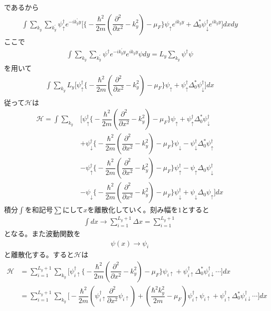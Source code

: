 \documentclass{jarticle}
\begin{document}
	であるから
	\begin{align}
	\int\displaystyle\sum_{k_y}\sum_{k_y^{'}}\psi_{\uparrow}^{\dagger}e^{-ik_y^{'}y}\Big[\big\{-\dfrac{\hbar^2}{2m}(\dfrac{\partial^{2}}{\partial x^2}-k^{2}_y)-\mu_F\big\}\psi_{\uparrow}e^{ik_yy}+\Delta^{*}_0\psi_{\downarrow}^{\dagger}e^{ik_yy}\Big]dxdy
	\end{align}
	ここで
	\begin{align}
	\int\displaystyle\sum_{k_y}\sum_{k_y^{'}}\psi^{\dagger}e^{-ik_y^{'}y}e^{ik_yy}{\psi}dy=L_y\sum_{k_y}\psi^{\dagger}\psi
	\end{align}
	を用いて
	\begin{align}
	\int\displaystyle\sum_{k_y}L_y\Big[\psi_{\uparrow}^{\dagger}\big\{-\dfrac{\hbar^2}{2m}(\dfrac{\partial^{2}}{\partial x^2}-k^{2}_y)-\mu_F\big\}\psi_{\uparrow}+\psi_{\uparrow}^{\dagger}\Delta^{*}_0\psi_{\downarrow}^{\dagger}\Big]dx
	\end{align}
	従って$\mathcal{H}$は
	\begin{align}
	\mathcal{H}=\int\displaystyle\sum_{k_y}&\Big[\psi_{\uparrow}^{\dagger}\big\{-\dfrac{\hbar^2}{2m}(\dfrac{\partial^{2}}{\partial x^2}-k^{2}_y)-\mu_F\big\}\psi_{\uparrow}+\psi_{\uparrow}^{\dagger}\Delta^{*}_0\psi_{\downarrow}^{\dagger}\\
	&+\psi_{\downarrow}^{\dagger}\big\{-\dfrac{\hbar^2}{2m}(\dfrac{\partial^{2}}{\partial x^2}-k^{2}_y)-\mu_F\big\}\psi_{\downarrow}-\psi_{\downarrow}^{\dagger}\Delta^{*}_0\psi_{\uparrow}^{\dagger}\\
	&-\psi_{\uparrow}^{\dagger}\big\{-\dfrac{\hbar^2}{2m}(\dfrac{\partial^{2}}{\partial x^2}-k^{2}_y)-\mu_F\big\}\psi_{\uparrow}^{\dagger}-\psi_{\uparrow}\Delta_0\psi_{\downarrow}^{\dagger}\\
	&-\psi_{\downarrow}\big\{-\dfrac{\hbar^2}{2m}(\dfrac{\partial^{2}}{\partial x^2}-k^{2}_y)-\mu_F\big\}\psi_{\downarrow}^{\dagger}+\psi_{\downarrow}\Delta_0\psi_{\uparrow}\Big]dx
	\end{align}
	積分$\int$を和記号$\sum$にして$x$を離散化していく。刻み幅を$1$とすると
	\begin{align}
	\int dx\rightarrow\sum_{i=1}^{L_y+1}\Delta x=\sum_{i=1}^{L_y+1}
	\end{align}
	となる。また波動関数を
	\begin{align}
	\psi(x)\rightarrow\psi_i
	\end{align}
	と離散化する。すると$\mathcal{H}$は
	\begin{align}
	\mathcal{H}&=\sum_{i=1}^{L_y+1}\displaystyle\sum_{k_y}\Big[\psi_{i\uparrow}^{\dagger}\big\{-\dfrac{\hbar^2}{2m}(\dfrac{\partial^{2}}{\partial x^2}-k^{2}_y)-\mu_F\big\}\psi_{i\uparrow}+\psi_{i\uparrow}^{\dagger}\Delta^{*}_0\psi_{i\downarrow}^{\dagger}\cdots\Big]dx\\
	&=\sum_{i=1}^{L_y+1}\displaystyle\sum_{k_y}\Big[-\dfrac{\hbar^2}{2m}(\psi_{i\uparrow}^{\dagger}\dfrac{\partial^{2}}{\partial x^2}\psi_{i\uparrow})+(\dfrac{\hbar^2k^{2}_y}{2m}-\mu_F)\psi_{i\uparrow}^{\dagger}\psi_{i\uparrow}+\psi_{i\uparrow}^{\dagger}\Delta^{*}_0\psi_{i\downarrow}^{\dagger}\cdots\Big]dx
	\end{align}
\end{document}
